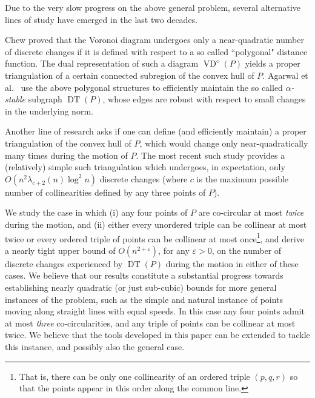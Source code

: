 \documentclass[letter,11pt]{article}
\def\eps{{\varepsilon}}
\def\eps{{\varepsilon}}
\def\poly{\diamond}
\def\DT{\mathop{\mathrm{DT}}}
\def\VD{\mathop{\mathrm{VD}}}
\begin{document}
Due to the very slow progress on the above general problem, several alternative lines of study have emerged in the last two decades.

Chew \cite{Chew} proved that the Voronoi diagram undergoes only a near-quadratic number of discrete changes if it is defined with respect to a so called ``polygonal" distance function. The dual representation of such a diagram $\VD^\poly(P)$ yields a proper triangulation of a certain connected subregion of the convex hull of $P$. Agarwal et al.~\cite{Stable} use the above polygonal structures
to efficiently maintain the so called {\it $\alpha$-stable} subgraph $\DT(P)$, whose edges are robust with respect to small changes in the underlying norm. 

Another line of research \cite{ABGHZ,AWY,KRS} asks if one can define (and efficiently maintain) a proper triangulation of the convex hull of $P$, which would change only near-quadratically many times during the motion of $P$. 
The most recent such study \cite{KRS} provides a (relatively) simple such triangulation which undergoes, in expectation, only $O(n^2\lambda_{c+2}(n)\log^2n)$ discrete changes (where $c$ is the maximum possible number of collinearities defined by any three points of $P$).



\smallskip
{}
We study the case in which (i) any four points of $P$ are co-circular at most {\it twice} during the motion, and (ii) either every unordered triple can be collinear at most twice or every ordered triple of points can be collinear at most once\footnote{That is, there can be only one collinearity of an ordered triple $(p,q,r)$ so that the points appear in this order along the common line.}, and derive a nearly tight upper bound of $O(n^{2+\eps})$, for any $\eps>0$, on the number of discrete changes experienced by $\DT(P)$ during the motion in either of these cases.
We believe that our results constitute a substantial progress towards establishing nearly quadratic (or just sub-cubic) bounds for more general instances of the problem, such as the simple and natural instance of points moving along straight lines with equal speeds. In this case any four points admit at most {\it three} co-circularities, and any triple of points can be collinear at most twice. We believe that the tools developed in this paper can be extended to tackle this instance, and possibly also the general case.
\end{document}
